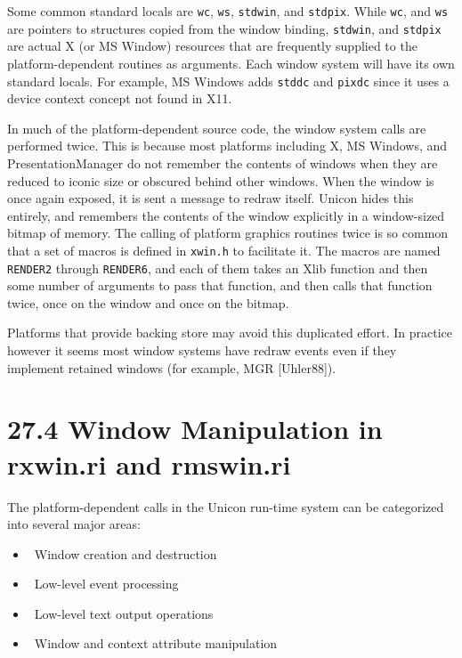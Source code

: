 Some common standard locals are \texttt{wc}, \texttt{ws},
\texttt{stdwin}, and \texttt{stdpix}. While \texttt{wc}, and
\texttt{ws} are pointers to structures copied from the window binding,
\texttt{stdwin}, and \texttt{stdpix} are actual X (or MS Window)
resources that are frequently supplied to the platform-dependent
routines as arguments. Each window system will have its own standard
locals. For example, MS Windows adds \texttt{stddc} and \texttt{pixdc}
since it uses a device context concept not found in X11.

In much of the platform-dependent source code, the window system calls
are performed twice. This is because most platforms including X, MS
Windows, and PresentationManager do not remember the contents of
windows when they are reduced to iconic size or obscured behind other
windows. When the window is once again exposed, it is sent a message
to redraw itself. Unicon hides this entirely, and remembers the
contents of the window explicitly in a window-sized bitmap of
memory. The calling of platform graphics routines twice is so common
that a set of macros is defined in \texttt{xwin.h} to facilitate it.
The macros are named \texttt{RENDER2} through \texttt{RENDER6}, and
each of them takes an Xlib function and then some number of arguments
to pass that function, and then calls that function twice, once on the
window and once on the bitmap.

Platforms that provide backing store may avoid this duplicated
effort. In practice however it seems most window systems have redraw
events even if they implement retained windows (for example, MGR
[Uhler88]).

\section[27.4 Window Manipulation in rxwin.ri and rmswin.ri]{27.4 Window Manipulation in rxwin.ri and rmswin.ri}

The platform-dependent calls in the Unicon run-time system can be
categorized into several major areas:

\liststyleLxlv
\begin{itemize}
\item 
\ Window creation and destruction
\item 
\ Low-level event processing
\item 
\ Low-level text output operations
\item 
\ Window and context attribute manipulation
\end{itemize}

